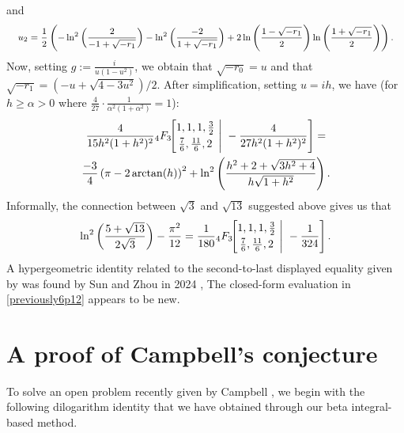 \documentclass[12pt]{article}
\begin{document}
 and 
\begin{equation*}
 \text{ { \footnotesize $ u_2=\frac{1}{2} \left( - \ln^2\left(\frac{2}{-1 + \sqrt{-r_1}}\right) 
 - \ln^2\left(\frac{-2}{1 + \sqrt{-r_1}}\right) + 2 \ln\left(\frac{1 - \sqrt{-r_1}}{2} \right) 
 \ln\left(\frac{1 + \sqrt{-r_1}}{2}\right) \right). $ } } 
 \end{equation*} 
 Now, setting $g := \frac{i}{u(1-u^2)}$, we obtain that $\sqrt{-r_0} = u$ and that $\sqrt{-r_1}=(-u+\sqrt{4-3u^2})/2$. After 
 simplification, setting $u=ih$, we have (for $h \geq \alpha >0 $ where $\frac{4}{27} \cdot \frac{1}{\alpha^2 (1 + \alpha^2)} = 1$):
\begin{multline*}
 \frac{4}{15h^2(1+h^2)^2} 
 {}_{4}F_{3}\!\!\left[ \begin{matrix} 
 1, 1, 1, \frac{3}{2} \vspace{1mm}\\ 
 \frac{7}{6}, \frac{11}{6}, 2 \end{matrix} \ \Bigg| \ -\frac{4}{27h^2(1+h^2)^2} \right] = \\ 
 \frac{-3}{4} \left(\pi - 2\arctan(h)\right)^2 
 + \ln^2\left(\frac{h^2 + 2 + \sqrt{3h^2 + 4}}{h\sqrt{1 + h^2}}\right). 
\end{multline*}
 Informally, the connection between $\sqrt{3}$ and $\sqrt{13}$ suggested above gives us that 
\begin{equation}\label{previously6p12}
 \ln^2\left(\frac{5 + \sqrt{13}}{2\sqrt{3}}\right) - \frac{\pi^2}{12} = 
 \frac{1}{180} {}_{4}F_{3}\!\!\left[ \begin{matrix} 
 1, 1, 1, \frac{3}{2} \vspace{1mm}\\ 
 \frac{7}{6}, \frac{11}{6}, 2 \end{matrix} \ \Bigg| \ -\frac{1}{324} \right]. 
\end{equation}
 A hypergeometric identity related to the second-to-last displayed equality given by was found by Sun and Zhou in 2024 
 \cite{SunZhoupreprint}, The closed-form evaluation in \eqref{previously6p12} appears to be new. 

\section{A proof of Campbell's conjecture} 
 To solve an open problem recently given by Campbell \cite{Campbell2025}, we begin with the following dilogarithm identity that we 
 have obtained through our beta integral-based method. 
\end{document}
